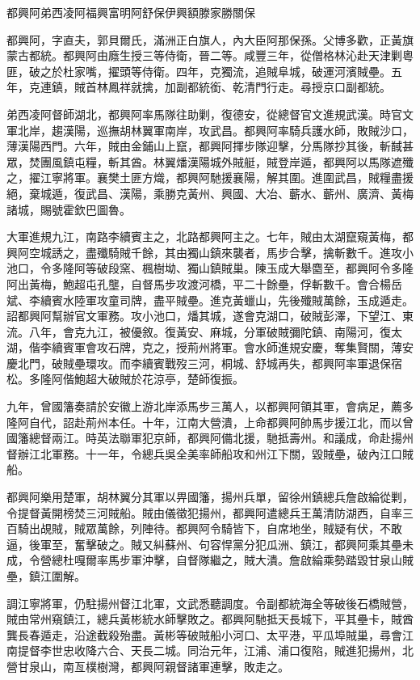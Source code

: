 
\begin{pinyinscope}
都興阿弟西凌阿福興富明阿舒保伊興額滕家勝關保

都興阿，字直夫，郭貝爾氏，滿洲正白旗人，內大臣阿那保孫。父博多歡，正黃旗蒙古都統。都興阿由廕生授三等侍衛，晉二等。咸豐三年，從僧格林沁赴天津剿粵匪，破之於杜家嘴，擢頭等侍衛。四年，克獨流，追賊阜城，破運河濱賊壘。五年，克連鎮，賊首林鳳祥就擒，加副都統銜、乾清門行走。尋授京口副都統。

弟西凌阿督師湖北，都興阿率馬隊往助剿，復德安，從總督官文進規武漢。時官文軍北岸，趨漢陽，巡撫胡林翼軍南岸，攻武昌。都興阿率騎兵護水師，敗賊沙口，薄漢陽西門。六年，賊由金鋪山上竄，都興阿揮步隊迎擊，分馬隊抄其後，斬馘甚眾，焚團風鎮屯糧，斬其酋。林翼燔漢陽城外賊艇，賊登岸遁，都興阿以馬隊遮殲之，擢江寧將軍。襄樊土匪方熾，都興阿馳援襄陽，解其圍。進圍武昌，賊糧盡援絕，棄城遁，復武昌、漢陽，乘勝克黃州、興國、大冶、蘄水、蘄州、廣濟、黃梅諸城，賜號霍欽巴圖魯。

大軍進規九江，南路李續賓主之，北路都興阿主之。七年，賊由太湖竄窺黃梅，都興阿空城誘之，盡殲騎賊千餘，其由獨山鎮來襲者，馬步合擊，擒斬數千。進攻小池口，令多隆阿等破段窯、楓樹坳、獨山鎮賊巢。陳玉成大舉麕至，都興阿令多隆阿出黃梅，鮑超屯孔壟，自督馬步攻渡河橋，平二十餘壘，俘斬數千。會合楊岳斌、李續賓水陸軍攻童司牌，盡平賊壘。進克黃蠟山，先後殲賊萬餘，玉成遁走。詔都興阿幫辦官文軍務。攻小池口，燔其城，遂會克湖口，破賊彭澤，下望江、東流。八年，會克九江，被優敘。復黃安、麻城，分軍破賊彌陀鎮、南陽河，復太湖，偕李續賓軍會攻石牌，克之，授荊州將軍。會水師進規安慶，奪集賢關，薄安慶北門，破賊壘環攻。而李續賓戰歿三河，桐城、舒城再失，都興阿率軍退保宿松。多隆阿偕鮑超大破賊於花涼亭，楚師復振。

九年，曾國籓奏請於安徽上游北岸添馬步三萬人，以都興阿領其軍，會病足，薦多隆阿自代，詔赴荊州本任。十年，江南大營潰，上命都興阿帥馬步援江北，而以曾國籓總督兩江。時英法聯軍犯京師，都興阿備北援，馳抵壽州。和議成，命赴揚州督辦江北軍務。十一年，令總兵吳全美率師船攻和州江下關，毀賊壘，破內江口賊船。

都興阿樂用楚軍，胡林翼分其軍以畀國籓，揚州兵單，留徐州鎮總兵詹啟綸從剿，令提督黃開榜焚三河賊船。賊由儀徵犯揚州，都興阿遣總兵王萬清防湖西，自率三百騎出覘賊，賊眾萬餘，列陣待。都興阿令騎皆下，自席地坐，賊疑有伏，不敢逼，後軍至，奮擊破之。賊又糾蘇州、句容悍黨分犯瓜洲、鎮江，都興阿乘其壘未成，令營總杜嘎爾率馬步軍沖擊，自督隊繼之，賊大潰。詹啟綸乘勢踏毀甘泉山賊壘，鎮江圍解。

調江寧將軍，仍駐揚州督江北軍，文武悉聽調度。令副都統海全等破後石橋賊營，賊由常州窺鎮江，總兵黃彬統水師擊敗之。都興阿馳抵天長城下，平其壘卡，賊酋龔長春遁走，沿途截殺殆盡。黃彬等破賊船小河口、太平港，平瓜埠賊巢，尋會江南提督李世忠收降六合、天長二城。同治元年，江浦、浦口復陷，賊進犯揚州，北營甘泉山，南亙樸樹灣，都興阿親督諸軍連擊，敗走之。


\end{pinyinscope}
